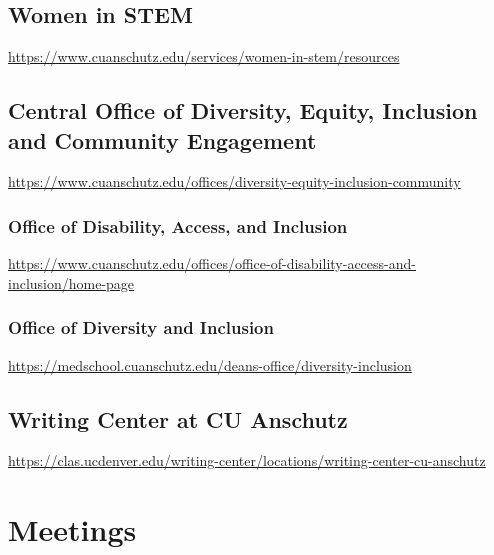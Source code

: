 \documentclass[
  letterpaper,
  DIV=11,
  numbers=noendperiod]{scrreprt}
\begin{document}
\hypertarget{women-in-stem}{%
\section{Women in STEM}\label{women-in-stem}}

\url{https://www.cuanschutz.edu/services/women-in-stem/resources}

\hypertarget{central-office-of-diversity-equity-inclusion-and-community-engagement}{%
\section{Central Office of Diversity, Equity, Inclusion and Community
Engagement}\label{central-office-of-diversity-equity-inclusion-and-community-engagement}}

\url{https://www.cuanschutz.edu/offices/diversity-equity-inclusion-community}

\hypertarget{office-of-disability-access-and-inclusion}{%
\subsection{Office of Disability, Access, and
Inclusion}\label{office-of-disability-access-and-inclusion}}

\url{https://www.cuanschutz.edu/offices/office-of-disability-access-and-inclusion/home-page}

\hypertarget{office-of-diversity-and-inclusion}{%
\subsection{Office of Diversity and
Inclusion}\label{office-of-diversity-and-inclusion}}

\url{https://medschool.cuanschutz.edu/deans-office/diversity-inclusion}

\hypertarget{writing-center-at-cu-anschutz}{%
\section{Writing Center at CU
Anschutz}\label{writing-center-at-cu-anschutz}}

\url{https://clas.ucdenver.edu/writing-center/locations/writing-center-cu-anschutz}


\hypertarget{meetings}{%
\chapter{Meetings}\label{meetings}}
\end{document}
